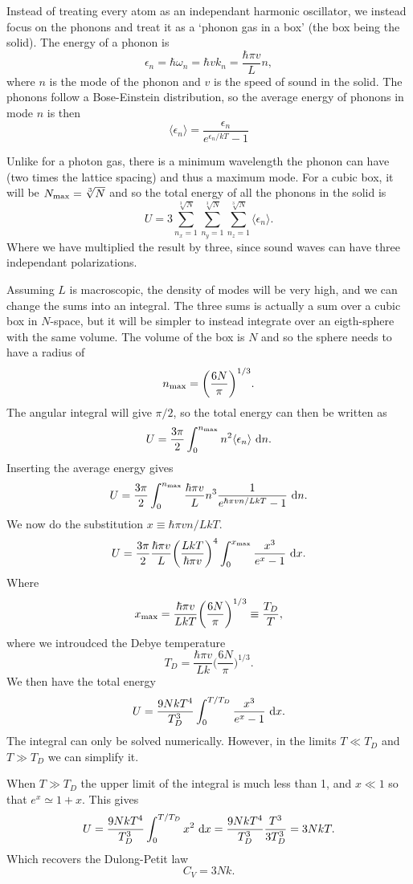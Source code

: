 \documentclass[a4paper, 11pt, notitlepage, english]{article}
\renewcommand{\d}{{\rm d}}
\newcommand{\eps}{\epsilon}
\begin{document}
Instead of treating every atom as an independant harmonic oscillator, we instead focus on the phonons and treat it as a `phonon gas in a box' (the box being the solid).  The energy of a phonon is 
$$\eps_n = \hbar \omega_n = \hbar v k_n = \frac{\hbar \pi v}{L}n,$$
where $n$ is the mode of the phonon and $v$ is the speed of sound in the solid. The phonons follow a Bose-Einstein distribution, so the average energy of phonons in mode $n$ is then 
$$\langle \eps_n \rangle = \frac{\eps_n}{e^{\eps_n/kT} - 1}$$

Unlike for a photon gas, there is a minimum wavelength the phonon can have (two times the lattice spacing) and thus a maximum mode. For a cubic box, it will be $N_{\rm max} = \sqrt[3]{N}$ and so the total energy of all the phonons in the solid is
$$U = 3\sum_{n_x=1}^{\sqrt[3]{N}}\sum_{n_y=1}^{\sqrt[3]{N}}\sum_{n_z=1}^{\sqrt[3]{N}} \langle \eps_n \rangle.$$
Where we have multiplied the result by three, since sound waves can have three independant polarizations.

Assuming $L$ is macroscopic, the density of modes will be very high, and we can change the sums into an integral. The three sums is actually a sum over a cubic box in $N$-space, but it will be simpler to instead integrate over an eigth-sphere with the same volume. The volume of the box is $N$ and so the sphere needs to have a radius of
$$n_{\rm max} = \bigg(\frac{6N}{\pi}\bigg)^{1/3}.$$
The angular integral will give $\pi/2$, so the total energy can then be written as
$$U = \frac{3\pi}{2} \int_{0}^{n_{\rm max}}  n^2 \langle \eps_n \rangle \ \d n.$$
Inserting the average energy gives
$$U = \frac{3\pi}{2} \int_{0}^{n_{\rm max}} \frac{\hbar \pi v}{L}n^3 \frac{1}{e^{\hbar \pi v n/LkT} - 1} \ \d n.$$ 
We now do the substitution $x \equiv \hbar \pi v n/LkT$.
$$U = \frac{3\pi}{2} \frac{\hbar \pi v}{L} \bigg(\frac{LkT}{\hbar\pi v}\bigg)^4 \int_0^{x_{\rm max}} \frac{x^3}{e^x-1} \ \d x.$$
Where 
$$x_{\rm max} = \frac{\hbar\pi v}{LkT} \bigg(\frac{6N}{\pi}\bigg)^{1/3} \equiv \frac{T_D}{T},$$
where we introudced the Debye temperature
$$T_D = \frac{\hbar\pi v}{Lk} \bigg(\frac{6N}{\pi}\bigg)^{1/3}.$$
We then have the total energy
$$U = \frac{9NkT^4}{T_D^3}\int_0^{T/T_D} \frac{x^3}{e^x - 1} \ \d x.$$
The integral can only be solved numerically. However, in the limits $T\ll T_D$ and $T \gg T_D$ we can simplify it.

When $T\gg T_D$ the upper limit of the integral is much less than 1, and $x \ll 1$ so that $e^x \simeq 1 + x$. This gives
$$U = \frac{9NkT^4}{T_D^3}\int_0^{T/T_D} x^2 \ \d x = \frac{9NkT^4}{T_D^3} \frac{T^3}{3T_D^3} = 3NkT.$$
Which recovers the Dulong-Petit law
$$C_V = 3Nk.$$
\end{document}
